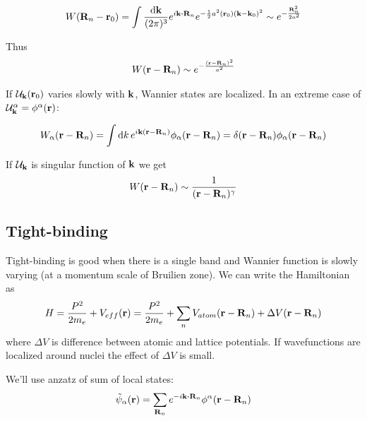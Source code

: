 \begin{align}
W(\vb{R}_n-\vb{r}_0) = \int \frac{\dd{\vb{k}}}{(2\pi)^3} e^{i\vb{k} \vdot \vb{R}_n} e^{-\frac{1}{2} a^2 (\vb{r}_0) (\vb{k} - \vb{k}_0)^2 } \sim e^{- \frac{\vb{R}_n^2}{2a^2}}
 \end{align}
 
 Thus
 \begin{align}
 W(\vb{r}-\vb{R}_n)  \sim e^{- \frac{(\vb{r}-\vb{R}_n)^2}{a^2}}
 \end{align}
 
If $\mathcal{U}_{\vb{k}}(\vb{r}_0)$ varies slowly with $\vb{k}$, Wannier states are localized. In an extreme case of 
$\mathcal{U}_{\vb{k}}^\alpha = \phi^\alpha(\vb{r})$:

\begin{align}
W_\alpha (\vb{r}- \vb{R}_n) = \int \dd{k} e^{i \vb{k}(\vb{r}-\vb{R}_n)} \phi_\alpha(\vb{r}-\vb{R}_n) = \delta(\vb{r} -\vb{R}_n)\phi_\alpha(\vb{r} -\vb{R}_n)
\end{align}

If $\mathcal{U}_{\vb{k}}$ is singular function of $\vb{k}$ we get
\begin{align}
W(\vb{r}-\vb{R}_n) \sim \frac{1}{(\vb{r}-\vb{R}_n)^\gamma}
\end{align}

\subsection{Tight-binding}
Tight-binding is good when there is a single band and Wannier function is slowly varying (at a momentum scale of Bruilien zone). 
We can write the Hamiltonian as
\begin{align}
H  = \frac{P^2}{2m_e} + V_{eff}(\vb{r}) =  \frac{P^2}{2m_e} + \sum_n V_{atom}(\vb{r}-\vb{R}_n) + \Delta V(\vb{r} - \vb{R}_n)
\end{align}
where $\Delta V$ is difference between atomic and lattice potentials. If wavefunctions are localized around nuclei the effect of $\Delta V$ is small.

We'll use anzatz of sum of local states:
\begin{align}
\tilde{\psi}_\alpha (\vb{r}) = \sum_{\vb{R}_n} e^{-i \vb{k} \vdot \vb{R}_n}\phi^\alpha (\vb{r}-\vb{R}_n)
\end{align}

